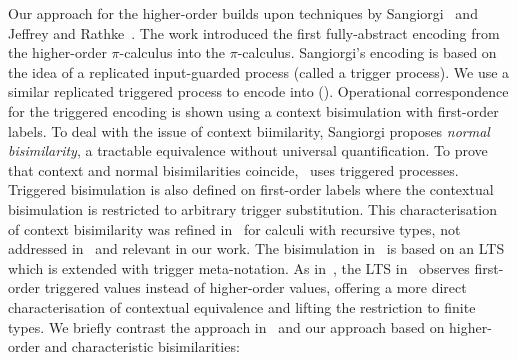 Our approach for the higher-order builds upon techniques by Sangiorgi~\cite{SangiorgiD:expmpa,San96H}
and Jeffrey and Rathke~\cite{JeffreyR05}.
The work %
\cite{SangiorgiD:expmpa}
introduced the first fully-abstract encoding from the higher-order 
$\pi$-calculus into the $\pi$-calculus. 
Sangiorgi's encoding is based on the idea of a replicated input-guarded process 
(called a trigger process). We use a similar 
replicated triggered process 
to encode \HOp into \sessp ().
 Operational correspondence for
the triggered encoding is shown using a context bisimulation
with first-order labels.
To deal with the issue of context biimilarity, 
Sangiorgi proposes \emph{normal bisimilarity}, 
a tractable  equivalence without universal quantification. 
To prove that context and normal bisimilarities coincide,~\cite{SangiorgiD:expmpa} uses 
triggered processes.
Triggered bisimulation is also defined on first-order labels
where the contextual bisimulation is restricted to arbitrary
trigger substitution. %
This
characterisation of context bisimilarity  was refined in~\cite{JeffreyR05} for
calculi with recursive types, not addressed in~\cite{San96H,SangiorgiD:expmpa} and
relevant in our work.
The
bisimulation in~\cite{JeffreyR05}
is based on an LTS which is extended with trigger meta-notation.
As in~\cite{San96H,SangiorgiD:expmpa}, 
the LTS in~\cite{JeffreyR05}
observes first-order triggered values instead of
higher-order values, offering a more direct characterisation of contextual equivalence
and lifting the restriction to finite types.
We briefly contrast 
the approach in~\cite{JeffreyR05} and our approach based on 
higher-order and characteristic bisimilarities:
